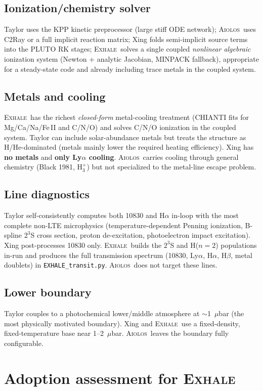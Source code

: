 \documentclass[11pt]{article}
\newcommand{\EXHALE}{\textsc{Exhale}}
\newcommand{\AIOLOS}{\textsc{Aiolos}}
\begin{document}
\subsection{Ionization/chemistry solver}
Taylor uses the KPP kinetic preprocessor (large stiff ODE network); \AIOLOS\ uses C2Ray or a
full implicit reaction matrix; Xing folds semi-implicit source terms into the PLUTO RK
stages; \EXHALE\ solves a single coupled \emph{nonlinear algebraic} ionization system (Newton
+ analytic Jacobian, MINPACK fallback), appropriate for a steady-state code and already
including trace metals in the coupled system.

\subsection{Metals and cooling}
\EXHALE\ has the richest \emph{closed-form} metal-cooling treatment (CHIANTI fits for
Mg/Ca/Na/Fe\,II and C/N/O) and solves C/N/O ionization in the coupled system. Taylor can
include solar-abundance metals but treats the structure as H/He-dominated (metals mainly
lower the required heating efficiency). Xing has \textbf{no metals} and \textbf{only
Ly$\alpha$ cooling}. \AIOLOS\ carries cooling through general chemistry (Black 1981, H$_3^+$)
but not specialized to the metal-line escape problem.

\subsection{Line diagnostics}
Taylor self-consistently computes both 10830 and H$\alpha$ in-loop with the most complete
non-LTE microphysics (temperature-dependent Penning ionization, B-spline $2^3$S cross
section, proton de-excitation, photoelectron impact excitation). Xing post-processes 10830
only. \EXHALE\ builds the $2^3$S and H($n{=}2$) populations in-run and produces the full
transmission spectrum (10830, Ly$\alpha$, H$\alpha$, H$\beta$, metal doublets) in
\texttt{EXHALE\_transit.py}. \AIOLOS\ does not target these lines.

\subsection{Lower boundary}
Taylor couples to a photochemical lower/middle atmosphere at $\sim$1~$\mu$bar (the most
physically motivated boundary). Xing and \EXHALE\ use a fixed-density, fixed-temperature base
near 1--2~$\mu$bar. \AIOLOS\ leaves the boundary fully configurable.

\section{Adoption assessment for \EXHALE}
\end{document}
